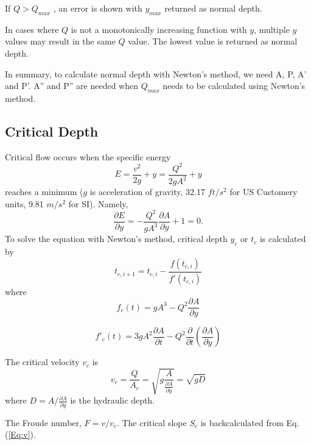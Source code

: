 \noindent If $Q > Q_{max}$ , an error is shown with $y_{max}$ returned as normal depth.  

\noindent In cases where $Q$ is not a monotonically increasing function with $y$, multiple $y$ values may result in the same $Q$ value. The lowest value is returned as normal depth. 

\noindent In summary, to calculate normal depth with Newton's method, we need A, P, A' and  P'. A'' and P'' are needed when $Q_{max}$ needs to be calculated using Newton's method.

\subsection{Critical Depth}
Critical flow occurs when the specific energy
\begin{equation}
E = \frac{v^2}{2g} + y =\frac{Q^2}{2gA^2} + y 
\end{equation}
reaches a minimum ($g$ is acceleration of gravity, 32.17 $ft/s^2$ for US Customery units, 9.81 $m/s^2$ for SI). Namely,
\begin{equation}
\frac{\partial E}{\partial y} =  -\frac{Q^2}{gA^3}\frac{\partial A}{\partial y} + 1 = 0.
\end{equation}
To solve the equation with Newton's method, critical depth $y_c$ or $t_c$ is calculated by
\begin{equation}  
t_{c,i+1} = t_{c,i} -\frac{f(t_{c,i})}{f'(t_{c,i})}
\end{equation}
where
\begin{equation}  
f_c(t)= gA^3 - Q^2\frac{\partial A}{\partial y} 
\label{Eq:C}
\end{equation}

\begin{equation}  
f'_c(t)= 3gA^2\frac{\partial A}{\partial t} - Q^2\frac{\partial}{\partial t}\left(\frac{\partial A}{\partial y}\right) 
\end{equation}

\noindent The critical velocity $v_c$ is 
\begin{equation}
v_c = \frac{Q}{A_c} = \sqrt{g \frac{A}{\frac{\partial A}{\partial y}}} = \sqrt{gD}
\end{equation}
where $D = A/\frac{\partial A}{\partial y}$ is the hydraulic depth.

\noindent The Froude number, $F = v/v_c$. The critical slope $S_c$ is backcalculated from Eq. (\ref{Eq:v}).


